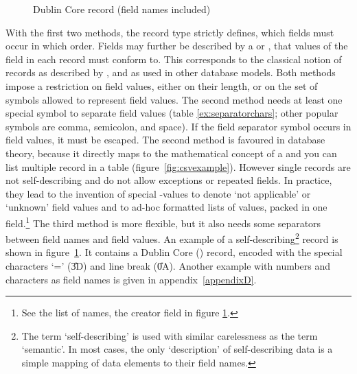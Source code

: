 \begin{figure}
\centering
{}
\caption{Dublin Core record (field names included)}
\label{fig:dcrecord}
\end{figure}

With the first two methods, the record type strictly defines, which fields must
occur in which order. Fields may further be described by a  or
, that values of the field in each record must conform to. This
corresponds to the classical notion of records as described by \textcite[ch.
8]{Kent1978}, and as used in other database models. Both methods impose a
restriction on field values, either on their length, or on the set of symbols
allowed to represent field values. The second method needs at least one special
symbol to separate field values (table \ref{ex:separatorchars}; other popular
symbols are comma, semicolon, and space). If the field separator symbol occurs
in field values, it must be escaped. The second method is favoured in database
theory, because it directly maps to the mathematical concept of a 
and you can list multiple record in a table (figure~\ref{fig:csvexample}).
However single records are not self-describing and do not allow exceptions or
repeated fields. In practice, they lead to the invention of special
-values to denote `not applicable' or `unknown' field values and to
ad-hoc formatted lists of values, packed in one field.\footnote{See the list of
names, the creator field in figure \ref{fig:dcrecord}.} The third method is
more flexible, but it also needs some separators between field names and field
values. An example of a self-describing\footnote{The term `self-describing' is
used with similar carelessness as the term `semantic'.  In most cases, the only
`description' of self-describing data is a simple mapping of data elements to
their field names.} record is shown in figure~\ref{fig:dcrecord}. It contains a
Dublin Core () record, encoded with the special characters `='
(\U{3D}) and line break (\U{0A}).  Another example with numbers and characters
as field names is given in appendix~\ref{appendixD}.

